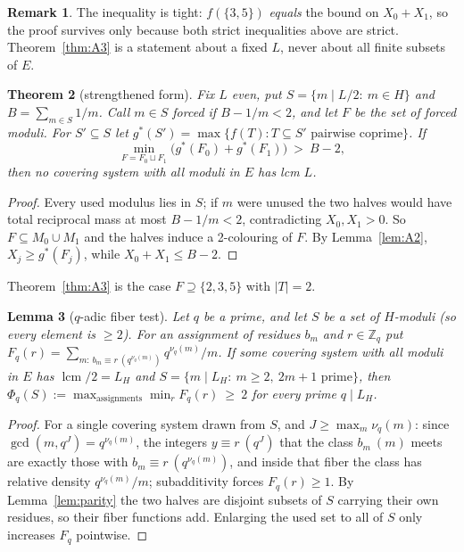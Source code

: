 \documentclass[11pt]{article}
\newtheorem{theorem}{Theorem}
\newtheorem{lemma}[theorem]{Lemma}
\theoremstyle{definition}
\newtheorem{remark}[theorem]{Remark}
\begin{document}
\begin{remark}
The inequality is tight: $f(\{3,5\})$ \emph{equals} the bound on $X_0+X_1$, so the proof survives
only because both strict inequalities above are strict. Theorem~\ref{thm:A3} is a statement about
a fixed $L$, never about all finite subsets of $E$.
\end{remark}

\begin{theorem}[strengthened form]\label{thm:A3plus}
Fix $L$ even, put $S=\{m\mid L/2:\ m\in H\}$ and $B=\sum_{m\in S}1/m$. Call $m\in S$
\emph{forced} if $B-1/m<2$, and let $F$ be the set of forced moduli. For $S'\subseteq S$ let
$g^*(S')=\max\{f(T):T\subseteq S'\text{ pairwise coprime}\}$. If
\[
\min_{F=F_0\sqcup F_1}\bigl(g^*(F_0)+g^*(F_1)\bigr)\ >\ B-2 ,
\]
then no covering system with all moduli in $E$ has lcm $L$.
\end{theorem}

\begin{proof}
Every used modulus lies in $S$; if $m$ were unused the two halves would have total reciprocal mass
at most $B-1/m<2$, contradicting $X_0,X_1>0$. So $F\subseteq M_0\cup M_1$ and the halves induce a
2-colouring of $F$. By Lemma~\ref{lem:A2}, $X_j\ge g^*(F_j)$, while $X_0+X_1\le B-2$.
\end{proof}

\noindent Theorem~\ref{thm:A3} is the case $F\supseteq\{2,3,5\}$ with $|T|=2$.

\begin{lemma}[$q$-adic fiber test]\label{lem:fiber}
Let $q$ be a prime, and let $S$ be a set of $H$-moduli (so every element is $\ge2$). For an
assignment of residues $b_m$ and $r\in\mathbb Z_q$ put
$F_q(r)=\sum_{m:\,b_m\equiv r\ (q^{\nu_q(m)})} q^{\nu_q(m)}/m$. If some covering system with all
moduli in $E$ has $\operatorname{lcm}/2=L_H$ and $S=\{m\mid L_H:\ m\ge2,\ 2m+1\text{ prime}\}$,
then $\Phi_q(S):=\max_{\text{assignments}}\min_r F_q(r)\ \ge\ 2$ for every prime $q\mid L_H$.
\end{lemma}

\begin{proof}
For a single covering system drawn from $S$, and $J\ge\max_m\nu_q(m)$: since
$\gcd(m,q^J)=q^{\nu_q(m)}$, the integers $y\equiv r\ (q^J)$ that the class $b_m\ (m)$ meets are
exactly those with $b_m\equiv r\ (q^{\nu_q(m)})$, and inside that fiber the class has relative
density $q^{\nu_q(m)}/m$; subadditivity forces $F_q(r)\ge1$. By Lemma~\ref{lem:parity} the two
halves are disjoint subsets of $S$ carrying their own residues, so their fiber functions add.
Enlarging the used set to all of $S$ only increases $F_q$ pointwise.
\end{proof}
\end{document}

